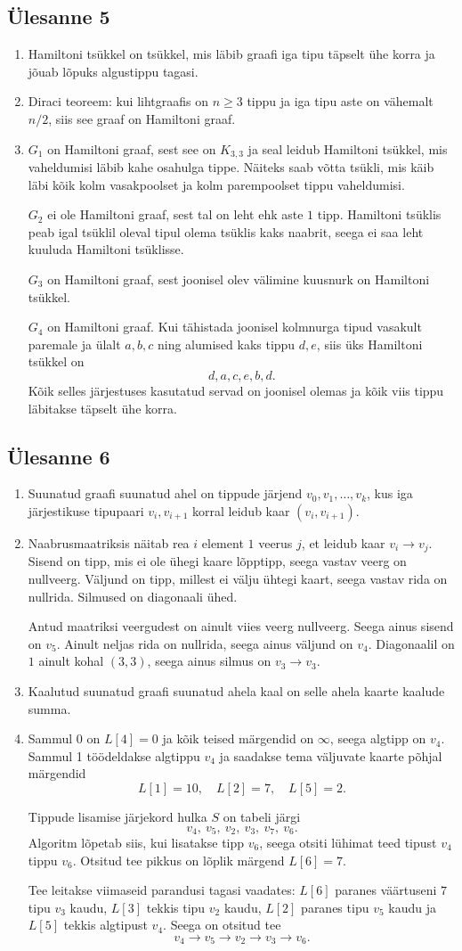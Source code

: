 \documentclass[11pt,a4paper]{article}
\newcommand{\yl}[1]{\subsection*{Ülesanne #1}}
\begin{document}
\yl{5}
\begin{enumerate}[label=\alph*.]
\item Hamiltoni tsükkel on tsükkel, mis läbib graafi iga tipu täpselt ühe korra ja jõuab lõpuks algustippu tagasi.
\item Diraci teoreem: kui lihtgraafis on $n\ge 3$ tippu ja iga tipu aste on vähemalt $n/2$, siis see graaf on Hamiltoni graaf.
\item $G_1$ on Hamiltoni graaf, sest see on $K_{3,3}$ ja seal leidub Hamiltoni tsükkel, mis vaheldumisi läbib kahe osahulga tippe. Näiteks saab võtta tsükli, mis käib läbi kõik kolm vasakpoolset ja kolm parempoolset tippu vaheldumisi.

$G_2$ ei ole Hamiltoni graaf, sest tal on leht ehk aste $1$ tipp. Hamiltoni tsüklis peab igal tsüklil oleval tipul olema tsüklis kaks naabrit, seega ei saa leht kuuluda Hamiltoni tsüklisse.

$G_3$ on Hamiltoni graaf, sest joonisel olev välimine kuusnurk on Hamiltoni tsükkel.

$G_4$ on Hamiltoni graaf. Kui tähistada joonisel kolmnurga tipud vasakult paremale ja ülalt $a,b,c$ ning alumised kaks tippu $d,e$, siis üks Hamiltoni tsükkel on
\[
d,a,c,e,b,d.
\]
Kõik selles järjestuses kasutatud servad on joonisel olemas ja kõik viis tippu läbitakse täpselt ühe korra.
\end{enumerate}

\yl{6}
\begin{enumerate}[label=\alph*.]
\item Suunatud graafi suunatud ahel on tippude järjend $v_0,v_1,\ldots,v_k$, kus iga järjestikuse tipupaari $v_i,v_{i+1}$ korral leidub kaar $(v_i,v_{i+1})$.
\item Naabrusmaatriksis näitab rea $i$ element $1$ veerus $j$, et leidub kaar $v_i\to v_j$. Sisend on tipp, mis ei ole ühegi kaare lõpptipp, seega vastav veerg on nullveerg. Väljund on tipp, millest ei välju ühtegi kaart, seega vastav rida on nullrida. Silmused on diagonaali ühed.

Antud maatriksi veergudest on ainult viies veerg nullveerg. Seega ainus sisend on $v_5$. Ainult neljas rida on nullrida, seega ainus väljund on $v_4$. Diagonaalil on $1$ ainult kohal $(3,3)$, seega ainus silmus on $v_3\to v_3$.
\item Kaalutud suunatud graafi suunatud ahela kaal on selle ahela kaarte kaalude summa.
\item Sammul 0 on $L[4]=0$ ja kõik teised märgendid on $\infty$, seega algtipp on $v_4$. Sammul 1 töödeldakse algtippu $v_4$ ja saadakse tema väljuvate kaarte põhjal märgendid
\[
L[1]=10,
\quad L[2]=7,
\quad L[5]=2.
\]

Tippude lisamise järjekord hulka $S$ on tabeli järgi
\[
v_4,
\ v_5,
\ v_2,
\ v_3,
\ v_7,
\ v_6.
\]
Algoritm lõpetab siis, kui lisatakse tipp $v_6$, seega otsiti lühimat teed tipust $v_4$ tippu $v_6$. Otsitud tee pikkus on lõplik märgend $L[6]=7$.

Tee leitakse viimaseid parandusi tagasi vaadates: $L[6]$ paranes väärtuseni $7$ tipu $v_3$ kaudu, $L[3]$ tekkis tipu $v_2$ kaudu, $L[2]$ paranes tipu $v_5$ kaudu ja $L[5]$ tekkis algtipust $v_4$. Seega on otsitud tee
\[
v_4\to v_5\to v_2\to v_3\to v_6.
\]
\end{enumerate}
\end{document}
